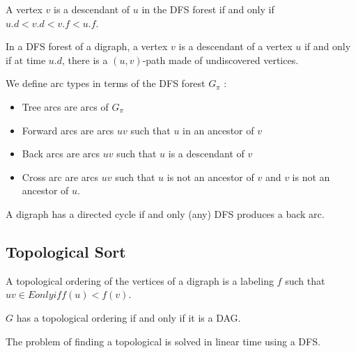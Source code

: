 \documentclass{cours}
\begin{document}
        \begin{corollary}
            A vertex $v$ is a descendant of $u$ in the DFS forest if and only if $u.d < v.d < v.f < u.f$.
        \end{corollary}

        \begin{theorem}
            In a DFS forest of a digraph, a vertex $v$ is a descendant of a vertex $u$ if and only if at time $u.d$, there is a $(u, v)$-path made of undiscovered vertices.
        \end{theorem}

        \begin{definition}
            We define arc types in terms of the DFS forest $G_{\pi}$ :
            \begin{itemize}
                \item Tree arcs are arcs of $G_{\pi}$
                \item Forward arcs are arcs $uv$ such that $u$ in an ancestor of $v$
                \item Back arcs are arcs $uv$ such that $u$ is a descendant of $v$
                \item Cross arc are arcs $uv$ such that $u$ is not an ancestor of $v$ and $v$ is not an ancestor of $u$.
            \end{itemize}
        \end{definition}

        \begin{proposition}
            A digraph has a directed cycle if and only (any) DFS produces a back arc.
        \end{proposition}
    
        \subsection{Topological Sort}
        \begin{definition}
            A topological ordering of the vertices of a digraph is a labeling $f$ such that $uv \in E only if f(u) < f(v)$.
        \end{definition}

        \begin{theorem}
            $G$ has a topological ordering if and only if it is a DAG.
        \end{theorem}

        \begin{theorem}
            The problem of finding a topological is solved in linear time using a DFS.
        \end{theorem}
\end{document}
